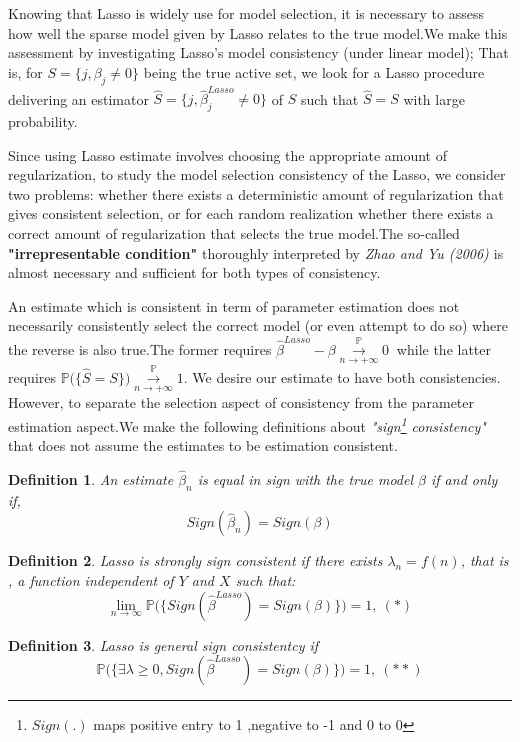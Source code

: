\documentclass[12pt]{report}
\newtheorem {definition}{Definition}[section] %
\begin{document}
Knowing that Lasso is widely use for model selection, it is necessary to assess how well the sparse model given by Lasso relates to the true model.We make this assessment by investigating Lasso's model consistency (under linear model); That is, for $S=\big\{ j, \beta_{j} \neq 0\big\}$ being the true active set, we look for a Lasso procedure delivering an estimator $\hat{S}=\big\{ j, \hat{\beta}^{Lasso}_{j} \neq 0\big\}$ of $S$ such that $\hat{S}=S$ with large probability.

Since using Lasso estimate involves choosing the appropriate amount of regularization, to study the model selection consistency of the Lasso, we consider two problems: whether there exists a deterministic amount of regularization that gives consistent selection, or for each random realization whether there exists a correct amount of regularization that selects the true model.The so-called \textbf{"irrepresentable condition"} thoroughly interpreted by \textit{Zhao and Yu (2006) \cite {nref15}} is almost necessary and sufficient for both types of consistency.

An estimate which is consistent in term of parameter estimation does not necessarily consistently select the correct model (or even attempt to do so) where the reverse is also true.The former requires $ \hat{\beta}^{Lasso}-\beta \overset{\mathbb{P}}{\underset{n\rightarrow +\infty}{\longrightarrow}}0\ $ while the latter requires $\mathbb{P}\big(\{\hat{S}=S\}\big)\overset{\mathbb{P}}{\underset{n\rightarrow +\infty}{\longrightarrow}}1$. We desire our estimate to have both consistencies. However, to separate the selection aspect of consistency from the parameter estimation aspect.We make the following definitions about \textit{"sign\footnote{$Sign(.)$ maps positive entry to 1 ,negative to -1 and 0 to 0 } consistency"} that does not assume the estimates to be estimation consistent.
\begin{definition}
	An estimate $\hat{\beta}_{n}$ is equal in sign with the true model $\beta$ if and only if,
	$$Sign(\hat{\beta}_{n})=Sign(\beta)$$
\end{definition}
\begin{definition}
	Lasso is strongly sign consistent if there exists $\lambda_{n}=f(n)$, that is , a function  independent of $Y$ and $X$ such that: 
	$$\lim_{n \rightarrow \infty}\mathbb{P}\big(\{ Sign(\hat{\beta}^{Lasso})=Sign(\beta)\}\big)=1,\ (\ast )$$
\end{definition}
\begin{definition}
	Lasso is general sign consistentcy if 
	$$\mathbb{P}\big(\{\exists\lambda \geq 0,Sign(\hat{\beta}^{Lasso})=Sign(\beta) \}\big)=1,\ (\ast \ast)$$
\end{definition}
\end{document}
